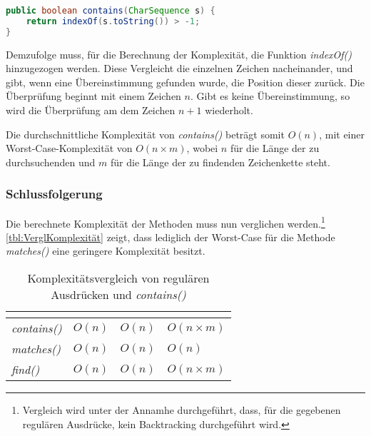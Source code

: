 \begin{lstlisting}[language=Java,caption=Funktionsweise von \textit{contains()},label=lst:contains]
public boolean contains(CharSequence s) {
    return indexOf(s.toString()) > -1;
}
\end{lstlisting}

Demzufolge muss, für die Berechnung der Komplexität, die Funktion \textit{indexOf()} hinzugezogen werden. Diese Vergleicht die einzelnen Zeichen nacheinander, und gibt, wenn eine Übereinstimmung gefunden wurde, die Position dieser zurück. Die Überprüfung beginnt mit einem Zeichen $n$. Gibt es keine Übereinstimmung, so wird die Überprüfung am dem Zeichen $n+1$ wiederholt.

Die durchschnittliche Komplexität von \textit{contains()} beträgt somit $O(n)$, mit einer Worst-Case-Komplexität von $O(n \times m)$, wobei $n$ für die Länge der zu durchsuchenden und $m$ für die Länge der zu findenden Zeichenkette steht. 

\subsubsection{Schlussfolgerung}
Die berechnete Komplexität der Methoden muss nun verglichen werden.\footnote{Vergleich wird unter der Annamhe durchgeführt, dass, für die gegebenen regulären Ausdrücke, kein Backtracking durchgeführt wird.} \autoref{tbl:VerglKomplexität} zeigt, dass lediglich der Worst-Case für die Methode \textit{matches()} eine geringere Komplexität besitzt. 

\begin{table}[h]
	\centering
	\begin{tabular}{| l | l | l | l |}
		\hline
		\rowcolor[HTML]{3531FF} 
		\multicolumn{1}{|l|}{\cellcolor[HTML]{4F88BB}{\color[HTML]{FFFFFF} {\bf Methode}}} & \multicolumn{1}{l|}{\cellcolor[HTML]{4F88BB}{\color[HTML]{FFFFFF} {\bf Best-Case}}} & \multicolumn{1}{l|}{\cellcolor[HTML]{4F88BB}{\color[HTML]{FFFFFF} {\bf Durchschnitt}}} & \multicolumn{1}{l|}{\cellcolor[HTML]{4F88BB}{\color[HTML]{FFFFFF} {\bf Worst-Case}}} \\ \hline
		\textit{contains()} & $O(n)$ & $O(n)$ & $O(n \times m)$ \\  \hline \hline
		\textit{matches()} & $O(n)$ & $O(n)$ & $O(n)$ \\ \hline
		\textit{find()} & $O(n)$ & $O(n)$ & $O(n \times m)$ \\  \hline
	\end{tabular}
	\caption{Komplexitätsvergleich von regulären Ausdrücken und \textit{contains()}}
	\label{tbl:VerglKomplexität}
\end{table}

